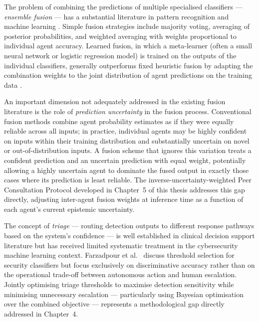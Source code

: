 The problem of combining the predictions of multiple specialised classifiers — \emph{ensemble
fusion} — has a substantial literature in pattern recognition and machine
learning \cite{Ferdous2024Comp}.
Simple fusion strategies include majority voting, averaging of posterior probabilities, and
weighted averaging with weights proportional to individual agent accuracy.
Learned fusion, in which a meta-learner (often a small neural network or logistic regression
model) is trained on the outputs of the individual classifiers, generally outperforms fixed
heuristic fusion by adapting the combination weights to the joint distribution of agent
predictions on the training data \cite{MultiAgentAdaptiveDetection2023}.

An important dimension not adequately addressed in the existing fusion literature is the role
of \emph{prediction uncertainty} in the fusion process.
Conventional fusion methods combine agent probability estimates as if they were equally
reliable across all inputs; in practice, individual agents may be highly confident on inputs
within their training distribution and substantially uncertain on novel or out-of-distribution
inputs.
A fusion scheme that ignores this variation treats a confident prediction and an uncertain
prediction with equal weight, potentially allowing a highly uncertain agent to dominate the
fused output in exactly those cases where its prediction is least reliable.
The inverse-uncertainty-weighted Peer Consultation Protocol developed in Chapter~5 of this
thesis addresses this gap directly, adjusting inter-agent fusion weights at inference time as
a function of each agent's current epistemic uncertainty.

The concept of \emph{triage} — routing detection outputs to different response pathways based
on the system's confidence — is well established in clinical decision support literature but
has received limited systematic treatment in the cybersecurity machine learning context.
Farzadpour et al.\ \cite{Farzadpour2024Thresholding} discuss threshold selection for
security classifiers but focus exclusively on discriminative accuracy rather than on the
operational trade-off between autonomous action and human escalation.
Jointly optimising triage thresholds to maximise detection sensitivity while minimising
unnecessary escalation — particularly using Bayesian optimisation over the combined
objective — represents a methodological gap directly addressed in Chapter~4.

